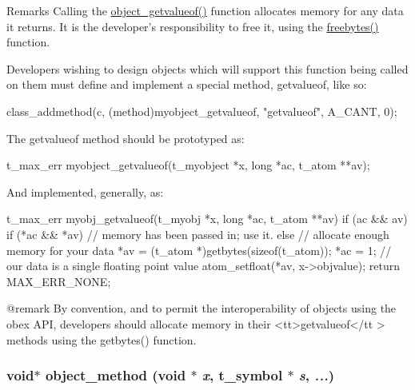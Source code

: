 \begin{DoxyRemark}{Remarks}
Calling the \hyperlink{group__obj_gab033973cea2f4a0b17bb48ab2f22f051}{object\_\-getvalueof()} function allocates memory for any data it returns. It is the developer's responsibility to free it, using the \hyperlink{group__memory_gaa1dc485c42515917ca377dbaf15b7dcd}{freebytes()} function.

Developers wishing to design objects which will support this function being called on them must define and implement a special method, {\ttfamily getvalueof}, like so: 
\begin{DoxyCode}
    class_addmethod(c, (method)myobject_getvalueof, "getvalueof", A_CANT, 0);
\end{DoxyCode}


The {\ttfamily getvalueof} method should be prototyped as: 
\begin{DoxyCode}
    t_max_err myobject_getvalueof(t_myobject *x, long *ac, t_atom **av);
\end{DoxyCode}


And implemented, generally, as: 
\begin{DoxyCode}
    t_max_err myobj_getvalueof(t_myobj *x, long *ac, t_atom **av) 
    {
        if (ac && av) {
            if (*ac && *av) {
                // memory has been passed in; use it.
            } else {
                // allocate enough memory for your data
                *av = (t_atom *)getbytes(sizeof(t_atom));
            }
            *ac = 1; // our data is a single floating point value
            atom_setfloat(*av, x->objvalue);
        }
        return MAX_ERR_NONE;
    }

    @remark         By convention, and to permit the interoperability of objects 
      using the obex API, 
                    developers should allocate memory in their <tt>getvalueof</tt
      > methods using the getbytes() function. 
\end{DoxyCode}
 
\end{DoxyRemark}
\hypertarget{group__obj_gae740749094827ac5adc2b7145db1c596}{
\subsubsection[{object\_\-method}]{\setlength{\rightskip}{0pt plus 5cm}void$\ast$ object\_\-method (void $\ast$ {\em x}, \/  {\bf t\_\-symbol} $\ast$ {\em s}, \/   {\em ...})}}
\label{group__obj_gae740749094827ac5adc2b7145db1c596}


